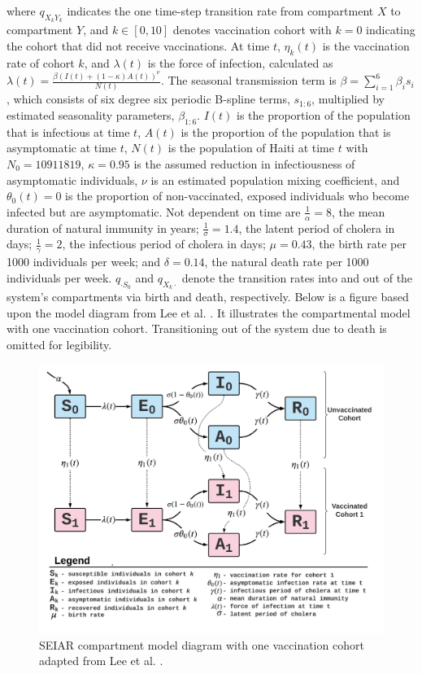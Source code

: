 \documentclass[12pt]{article}
\begin{document}
\noindent where $q_{X_kY_k}$ indicates the one time-step transition rate from compartment $X$ to compartment $Y$, and $k \in [0, 10]$ denotes vaccination cohort with $k = 0$ indicating the cohort that did not receive vaccinations. At time $t$, $\eta_k(t)$ is the vaccination rate of cohort $k$, and $\lambda (t)$ is the force of infection, calculated as $\lambda(t) = \frac{\beta(I(t) + (1-\kappa)A(t))^\nu}{N(t)}$. The seasonal transmission term is $\beta = \sum_{i = 1}^6 \beta_i s_i$, which consists of six degree six periodic B-spline terms, $s_{1:6}$, multiplied by estimated seasonality parameters, $\beta_{1:6}$. $I(t)$ is the proportion of the population that is infectious at time $t$, $A(t)$ is the proportion of the population that is asymptomatic at time $t$, $N(t)$ is the population of Haiti at time $t$ with $N_0 = 10911819$, $\kappa = 0.95$ is the assumed reduction in infectiousness of asymptomatic individuals, $\nu$ is an estimated population mixing coefficient, and $\theta_0(t) = 0$ is the proportion of non-vaccinated, exposed individuals who become infected but are asymptomatic. Not dependent on time are $\frac{1}{\alpha} = 8$, the mean duration of natural immunity in years; $\frac{1}{\sigma} = 1.4$, the latent period of cholera in days; $\frac{1}{\gamma} = 2$, the infectious period of cholera in days; $\mu = 0.43$, the birth rate per 1000 individuals per week; and $\delta = 0.14$, the natural death rate per 1000 individuals per week. $q_{\cdot S_0}$ and $q_{X_k \cdot}$ denote the transition rates into and out of the system's compartments via birth and death, respectively. Below is a figure based upon the model diagram from Lee et al. \cite{Lee_supp}. It illustrates the compartmental model with one vaccination cohort. Transitioning out of the system due to death is omitted for legibility.
        \begin{figure}[H]
          \centering
          \includegraphics[width=170mm]{SEIAR.png}
          \caption{SEIAR compartment model diagram with one vaccination cohort adapted from Lee et al. \cite{Lee_supp}.}
        \end{figure}
\end{document}
